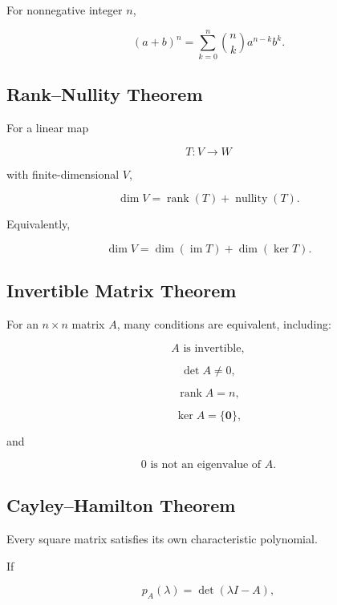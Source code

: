 For nonnegative integer \(n\),

\[
\boxed{
(a+b)^n
=
\sum_{k=0}^{n}
\binom{n}{k}
a^{n-k}b^k.
}
\]

\subsection{Rank--Nullity Theorem}
\label{subsec:rank-nullity-summary}

For a linear map

\[
T:V\to W
\]

with finite-dimensional \(V\),

\[
\boxed{
\dim V
=
\operatorname{rank}(T)
+
\operatorname{nullity}(T).
}
\]

Equivalently,

\[
\boxed{
\dim V
=
\dim(\operatorname{im}T)
+
\dim(\ker T).
}
\]

\subsection{Invertible Matrix Theorem}
\label{subsec:invertible-matrix-summary}

For an \(n\times n\) matrix \(A\), many conditions are equivalent, including:

\[
\boxed{
A
\text{ is invertible},
}
\]

\[
\boxed{
\det A\neq0,
}
\]

\[
\boxed{
\operatorname{rank}A=n,
}
\]

\[
\boxed{
\ker A=\{\mathbf0\},
}
\]

and

\[
\boxed{
0
\text{ is not an eigenvalue of }A.
}
\]

\subsection{Cayley--Hamilton Theorem}
\label{subsec:cayley-hamilton-summary}

Every square matrix satisfies its own characteristic polynomial.

If

\[
p_A(\lambda)
=
\det(\lambda I-A),
\]

